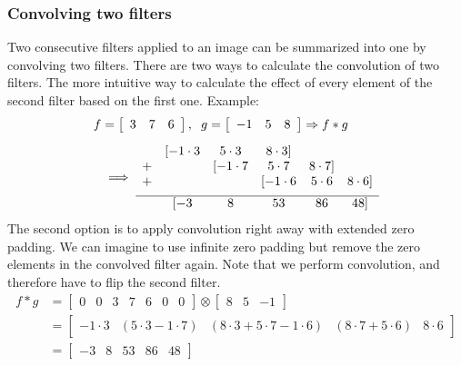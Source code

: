 \subsubsection{Convolving two filters}
Two consecutive filters applied to an image can be summarized into one by convolving two filters. There are two ways to calculate the convolution of two filters. The more intuitive way to calculate the effect of every element of the second filter based on the first one.
Example:
\begin{equation*}
	\begin{split}
		f &=\left[\begin{array}{ccc}3 & 7 & 6\end{array}\right], \hspace{2mm}g=\left[\begin{array}{ccc}-1 & 5 & 8\end{array}\right] \Rightarrow f\ast g \\[5pt]
		& \implies \begin{array}{cccccc}
			& [-1\cdot 3 & 5\cdot 3 & 8\cdot 3] & & \\
		 +	& & [-1\cdot 7 & 5\cdot 7 & 8\cdot 7] & \\
		 +	& & & [-1\cdot 6 & 5\cdot 6 & 8\cdot 6] \\[5pt]
		 \hline
		 & [ -3 & 8 & 53 & 86 & 48 ]
		\end{array}
	\end{split}
\end{equation*}
The second option is to apply convolution right away with extended zero padding. We can imagine to use infinite zero padding but remove the zero elements in the convolved filter again. Note that we perform convolution, and therefore have to flip the second filter.
\begin{equation*}
	\begin{split}
		f\ast g & = \left[\begin{array}{ccccccc}0 & 0 & 3 & 7 & 6 & 0 & 0\end{array}\right] \otimes \left[\begin{array}{ccc}8 & 5 & -1\end{array}\right]\\
		& = \left[\begin{array}{ccccccc}-1\cdot 3 & (5\cdot 3 - 1\cdot 7) & (8\cdot 3 + 5\cdot 7 - 1\cdot 6) & (8\cdot 7 + 5\cdot 6) & 8\cdot 6\end{array}\right]\\
		& = \left[\begin{array}{ccccc}-3 & 8 & 53 & 86 & 48\end{array}\right]
	\end{split}
\end{equation*}
